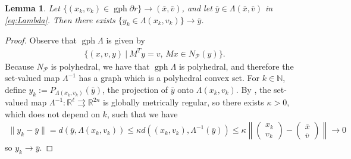 \documentclass[reqno]{amsart}
\newtheorem{lemma}[proposition]{Lemma}
\numberwithin{equation}{section}
\newcommand{\R}{\mathbb{R}}
\newcommand{\pol}{\mathcal{P}}
\newcommand{\gph}{\operatorname{gph}}
\begin{document}
\begin{lemma}\label{lem:Lambda}  Let $\{(x_k,v_k)\in  \operatorname{gph} \partial r\}\to (\bar x,\bar v)$, and let $\bar y \in \Lambda(\bar x,\bar v)$ in \eqref{eq:Lambda}. Then there exists $\{y_k\in \Lambda(x_k,v_k)\}\to\bar y$.
\end{lemma}
 \begin{proof}
 Observe that $\gph \Lambda$ is given by \begin{align*}
     \{(x, v, y) \ | \ M^Ty = v, \, Mx \in N_{\pol}(y)\}.
 \end{align*} Because $N_{\pol}$ is polyhedral, we have that $\gph \Lambda$ is polyhedral, and therefore the set-valued map $\Lambda^{-1}$ has a graph which is a polyhedral convex set.
 For $k \in \mathbb N$, define $y_k := P_{\Lambda(x_k, v_k)}(\bar y)$, the projection of $\bar y$ onto $\Lambda (x_k, v_k)$. By \cite[Example 9.47]{RoW 98}, the set-valued map $\Lambda^{-1} : \R^{\ell} \rightrightarrows \R^{2n}$ is globally metrically regular, so there exists $\kappa > 0$, which does not depend on $k$, such that we have
 \begin{align*}
 \lVert y_k - \bar y \rVert = d(\bar y, \Lambda (x_k, v_k))
 \le \kappa d((x_k, v_k), \Lambda^{-1}(\bar y)) \le \kappa \left\lVert 
 \begin{pmatrix}
     x_k \\
     v_k
 \end{pmatrix} - \begin{pmatrix}
     \bar x \\
     \bar v
 \end{pmatrix}\right\rVert \to 0
 \end{align*} so $y_k \to \bar y$.
\end{proof}
\end{document}
